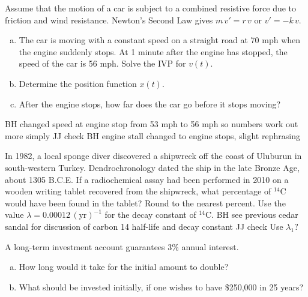 \documentclass[12pt]{book}
\begin{document}
\begin{exercise}
Assume that the motion of a car is subject to a combined resistive force due to friction and wind resistance.
Newton's Second Law gives $m\,v' = r\,v$ or $v'=-k\,v$.
\begin{enumerate}[a)]
    \item The car is moving with a constant speed on a straight road at 70 mph when the engine suddenly stops.
    {\color{blue}
    At 1 minute after the engine has stopped, the speed of the car is 56 mph. Solve the IVP for $v(t)$.
    }
    \item Determine the position function $x(t)$.
    \item 
    {\color{blue}After the engine stops, how far does the car go before it stops moving?
    }
\end{enumerate}
{\color{teal}BH changed speed at engine stop from 53 mph to 56 mph so numbers work out more simply
JJ check}
{\color{teal}BH engine stall changed to engine stops, slight rephrasing}
\end{exercise}

\begin{exercise}
In 1982, a local sponge diver discovered a shipwreck off the coast of Uluburun in south-western Turkey.
Dendrochronology dated the ship in the late Bronze Age, about 1305 B.C.E. If a radiochemical assay had been 
performed in 2010 on a wooden writing tablet recovered from the shipwreck, what percentage of ${}^{14}\text{C}$
would have been found in the tablet? 
{\color{blue}
Round to the nearest percent. Use the value $\lambda = 0.00012 \, (\text{yr})^{-1}$ for the decay constant of ${}^{14}\text{C}$.
}
{\color{teal}BH see previous cedar sandal for
discussion of carbon 14 half-life and
decay constant JJ check Use $\lambda_1?$
}

\end{exercise}


\begin{exercise}
A long-term investment account guarantees 3\% annual interest. %
\begin{enumerate}[a)]
    \item How long would it take for the initial amount to double?
    \item What should be invested initially, if one wishes to have \$250,000 in 25 years?
\end{enumerate}
\end{exercise}
\end{document}
